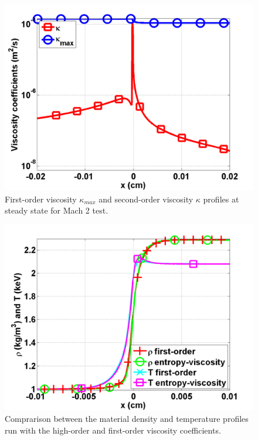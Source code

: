 \documentclass[review]{elsarticle}
\begin{document}
\begin{figure}[H]
                \centering
                \includegraphics[width=\textwidth]{Mach_2_nel_2000_viscosity.png}
        \caption{First-order viscosity $\kappa_{max}$ and second-order viscosity $\kappa$ profiles at steady state for Mach 2 test.}\label{fig:Mach2_viscosity}
\end{figure}
\begin{figure}[H]
                \centering
                \includegraphics[width=\textwidth]{Mach_2_fo_ev.png}
        \caption{Comprarison between the material density and temperature profiles run with the high-order and first-order viscosity coefficients.}\label{fig:Mach2_tempEVandFO}
\end{figure}
\end{document}
